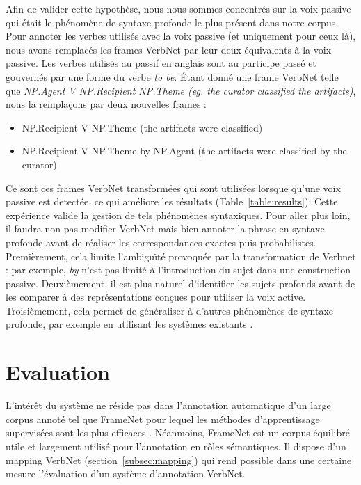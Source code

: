 Afin de valider cette hypothèse, nous nous sommes concentrés sur la voix
passive qui était le phénomène de syntaxe profonde le plus présent dans notre
corpus.  Pour annoter les verbes utilisés avec la voix passive (et uniquement
pour ceux là), nous avons remplacés les frames VerbNet par leur deux
équivalents à la voix passive. Les verbes utilisés au passif en anglais sont au
participe passé et gouvernés par une forme du verbe \emph{to be}. Étant donné
une frame VerbNet telle que \emph{NP.Agent V NP.Recipient NP.Theme (eg. the
curator classified the artifacts)}, nous la remplaçons par deux nouvelles
frames :

\begin{itemize}
    \item NP.Recipient V NP.Theme (the artifacts were classified)
    \item NP.Recipient V NP.Theme by NP.Agent (the artifacts were classified by the curator)
\end{itemize}

Ce sont ces frames VerbNet transformées qui sont utilisées lorsque qu'une voix
passive est detectée, ce qui améliore les résultats
(Table~\ref{table:results}). Cette expérience valide la gestion de tels
phénomènes syntaxiques. Pour aller plus loin, il faudra non pas modifier
VerbNet mais bien annoter la phrase en syntaxe profonde avant de réaliser les
correspondances exactes puis probabilistes. Premièrement, cela limite
l'ambiguïté provoquée par la transformation de Verbnet : par exemple, \emph{by}
n'est pas limité à l'introduction du sujet dans une construction passive.
Deuxièmement, il est plus naturel d'identifier les sujets profonds avant de les
comparer à des représentations conçues pour utiliser la voix active.
Troisièmement, cela permet de généraliser à d'autres phénomènes de syntaxe
profonde, par exemple en utilisant les systèmes existants
\citep{bonfante2011modular,ribeyre2013systeme}.

\section{Evaluation}
\label{srl:evaluation}

L'intérêt du système ne réside pas dans l'annotation automatique d'un large
corpus annoté tel que FrameNet pour lequel les méthodes d'apprentissage
supervisées sont les plus efficaces \citep{das2014frame}. Néanmoins, FrameNet
est un corpus équilibré utile et largement utilisé pour l'annotation en rôles
sémantiques. Il dispose d'un mapping VerbNet (section~\ref{subsec:mapping}) qui
rend possible dans une certaine mesure l'évaluation d'un système d'annotation
VerbNet.

